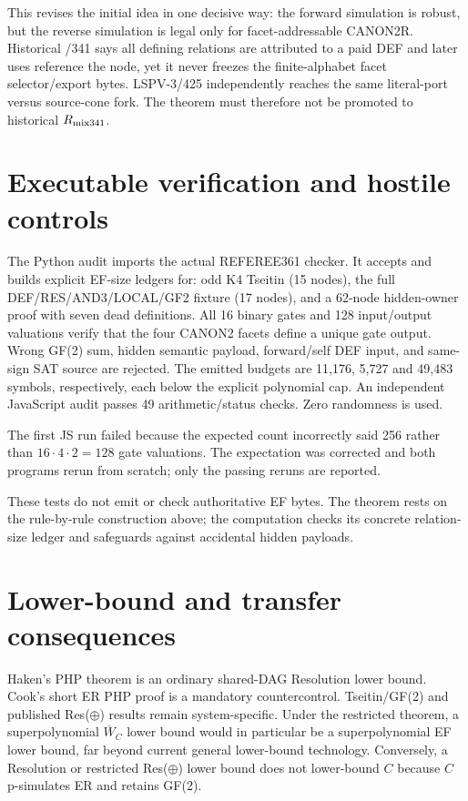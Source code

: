 \documentclass[11pt]{article}
\begin{document}
This revises the initial idea in one decisive way: the forward simulation is
robust, but the reverse simulation is legal only for facet-addressable
CANON2R.  Historical /341 says all defining relations are attributed to a paid
DEF and later uses reference the node, yet it never freezes the finite-alphabet
facet selector/export bytes.  LSPV-3/425 independently reaches the same
literal-port versus source-cone fork.  The theorem must therefore not be
promoted to historical $R_{\rm mix341}$.

\section{Executable verification and hostile controls}

The Python audit imports the actual REFEREE361 checker.  It accepts and builds
explicit EF-size ledgers for: odd K4 Tseitin (15 nodes), the full
DEF/RES/AND3/LOCAL/GF2 fixture (17 nodes), and a 62-node hidden-owner proof with
seven dead definitions.  All 16 binary gates and 128 input/output valuations
verify that the four CANON2 facets define a unique gate output.  Wrong GF(2)
sum, hidden semantic payload, forward/self DEF input, and same-sign SAT source
are rejected.  The emitted budgets are 11,176, 5,727 and 49,483 symbols,
respectively, each below the explicit polynomial cap.  An independent
JavaScript audit passes 49 arithmetic/status checks.  Zero randomness is used.

The first JS run failed because the expected count incorrectly said 256 rather
than $16\cdot4\cdot2=128$ gate valuations.  The expectation was corrected and
both programs rerun from scratch; only the passing reruns are reported.

These tests do not emit or check authoritative EF bytes.  The theorem rests on
the rule-by-rule construction above; the computation checks its concrete
relation-size ledger and safeguards against accidental hidden payloads.

\section{Lower-bound and transfer consequences}

Haken's PHP theorem is an ordinary shared-DAG Resolution lower bound.  Cook's
short ER PHP proof is a mandatory countercontrol.  Tseitin/GF(2) and published
Res($\oplus$) results remain system-specific.  Under the restricted theorem, a
superpolynomial $\overline W_C$ lower bound would in particular be a
superpolynomial EF lower bound, far beyond current general lower-bound
technology.  Conversely, a Resolution or restricted Res($\oplus$) lower bound
does not lower-bound $C$ because $C$ p-simulates ER and retains GF(2).
\end{document}
